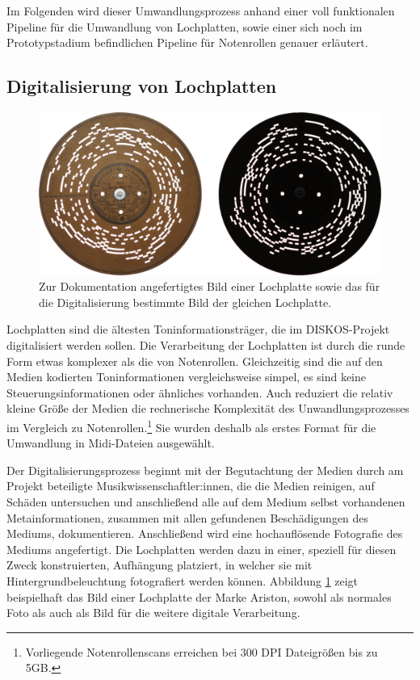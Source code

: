 Im Folgenden wird dieser Umwandlungsprozess anhand einer voll funktionalen Pipeline für die Umwandlung von Lochplatten, sowie einer sich noch im Prototypstadium befindlichen Pipeline für Notenrollen genauer erläutert.

\subsection{Digitalisierung von Lochplatten}

\begin{figure}[t]
    \centering
    \includegraphics[width=\textwidth]{graphics/ariston_pictures.png}
    \caption{Zur Dokumentation angefertigtes Bild einer Lochplatte sowie das für die Digitalisierung bestimmte Bild der gleichen Lochplatte.}
    \label{pappplattenphotos}
\end{figure}

Lochplatten sind die ältesten Toninformationsträger, die im DISKOS-Projekt digitalisiert werden sollen.
Die Verarbeitung der Lochplatten ist durch die runde Form etwas komplexer als die von Notenrollen.
Gleichzeitig sind die auf den Medien kodierten Toninformationen vergleichsweise simpel, es sind keine Steuerungsinformationen oder ähnliches vorhanden.
Auch reduziert die relativ kleine Größe der Medien die rechnerische Komplexität des Unwandlungsprozesses im Vergleich zu Notenrollen.\footnote{Vorliegende Notenrollenscans erreichen bei 300 DPI Dateigrößen bis zu 5GB.}
Sie wurden deshalb als erstes Format für die Umwandlung in Midi-Dateien ausgewählt.

Der Digitalisierungsprozess beginnt mit der Begutachtung der Medien durch am Projekt beteiligte Musikwissenschaftler:innen, die die Medien reinigen, auf Schäden untersuchen und anschließend alle auf dem Medium selbst vorhandenen Metainformationen, zusammen mit allen gefundenen Beschädigungen des Mediums, dokumentieren.
Anschließend wird eine hochauflösende Fotografie des Mediums angefertigt.
Die Lochplatten werden dazu in einer, speziell für diesen Zweck konstruierten, Aufhängung platziert, in welcher sie mit Hintergrundbeleuchtung fotografiert werden können.
Abbildung \ref{pappplattenphotos} zeigt beispielhaft das Bild einer Lochplatte der Marke Ariston, sowohl als normales Foto als auch als Bild für die weitere digitale Verarbeitung.

